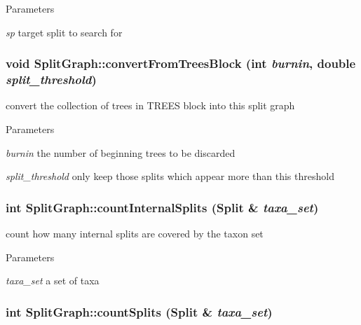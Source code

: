 \begin{DoxyParams}{Parameters}
\item[{\em sp}]target split to search for \end{DoxyParams}
\hypertarget{classSplitGraph_a9cc756e24638ce4b7f78605c8ccb6543}{
\subsubsection[{convertFromTreesBlock}]{\setlength{\rightskip}{0pt plus 5cm}void SplitGraph::convertFromTreesBlock (int {\em burnin}, \/  double {\em split\_\-threshold})}}
\label{classSplitGraph_a9cc756e24638ce4b7f78605c8ccb6543}
convert the collection of trees in TREES block into this split graph 
\begin{DoxyParams}{Parameters}
\item[{\em burnin}]the number of beginning trees to be discarded \item[{\em split\_\-threshold}]only keep those splits which appear more than this threshold \end{DoxyParams}
\hypertarget{classSplitGraph_a8124b259486ab72f1a53119b11001805}{
\subsubsection[{countInternalSplits}]{\setlength{\rightskip}{0pt plus 5cm}int SplitGraph::countInternalSplits ({\bf Split} \& {\em taxa\_\-set})}}
\label{classSplitGraph_a8124b259486ab72f1a53119b11001805}
count how many internal splits are covered by the taxon set 
\begin{DoxyParams}{Parameters}
\item[{\em taxa\_\-set}]a set of taxa \end{DoxyParams}
\hypertarget{classSplitGraph_a9e3db1bb803fc6ee62082eae9978057d}{
\subsubsection[{countSplits}]{\setlength{\rightskip}{0pt plus 5cm}int SplitGraph::countSplits ({\bf Split} \& {\em taxa\_\-set})}}
\label{classSplitGraph_a9e3db1bb803fc6ee62082eae9978057d}
